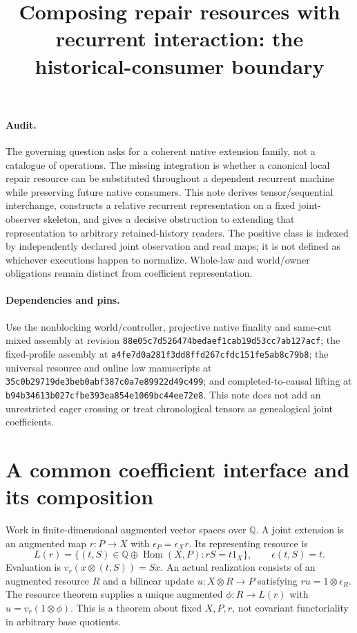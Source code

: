\documentclass{article}
\title{Composing repair resources with recurrent interaction: the historical-consumer boundary}
\author{}\date{}
\begin{document}
\maketitle
\paragraph{Audit.}
The governing question asks for a coherent native extension family, not a catalogue of operations. The missing integration is whether a canonical local repair resource can be substituted throughout a dependent recurrent machine while preserving future native consumers. This note derives tensor/sequential interchange, constructs a relative recurrent representation on a fixed joint-observer skeleton, and gives a decisive obstruction to extending that representation to arbitrary retained-history readers. The positive class is indexed by independently declared joint observation and read maps; it is not defined as whichever executions happen to normalize. Whole-law and world/owner obligations remain distinct from coefficient representation.

\paragraph{Dependencies and pins.}
Use the nonblocking world/controller, projective native finality and same-cut mixed assembly at revision \texttt{88e05c7d526474bedaef1cab19d53cc7ab127acf}; the fixed-profile assembly at \texttt{a4fe7d0a281f3dd8ffd267cfdc151fe5ab8c79b8}; the universal resource and online law manuscripts at \texttt{35c0b29719de3beb0abf387c0a7e89922d49c499}; and completed-to-causal lifting at \texttt{b94b34613b027cfbe393ea854e1069bc44ee72e8}. This note does not add an unrestricted eager crossing or treat chronological tensors as genealogical joint coefficients.

\section{A common coefficient interface and its composition}
Work in finite-dimensional augmented vector spaces over $\mathbb Q$. A joint extension is an augmented map $r:P\to X$ with $\epsilon_P=\epsilon_Xr$. Its representing resource is
\[
 L(r)=\{(t,S)\in\mathbb Q\oplus\operatorname{Hom}(X,P):rS=t1_X\},\qquad\epsilon(t,S)=t.
\]
Evaluation is $v_r(x\otimes(t,S))=Sx$. An actual realization consists of an augmented resource $R$ and a bilinear update $u:X\otimes R\to P$ satisfying $ru=1\otimes\epsilon_R$. The resource theorem supplies a unique augmented $\phi:R\to L(r)$ with $u=v_r(1\otimes\phi)$. This is a theorem about fixed $X,P,r$, not covariant functoriality in arbitrary base quotients.
\end{document}
